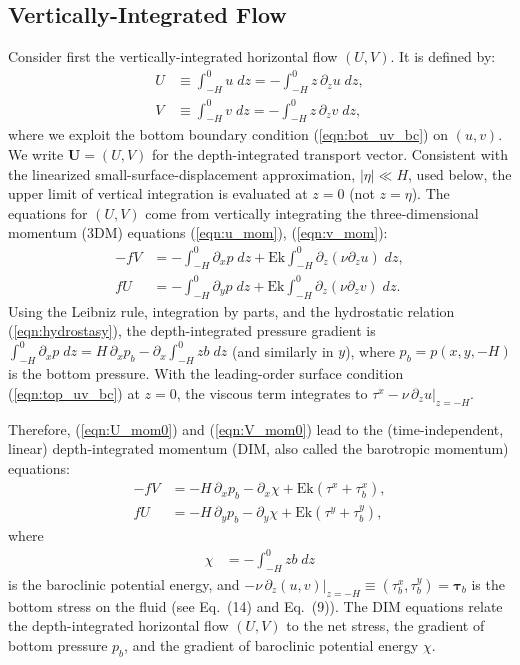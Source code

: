 \documentclass{ametsocV6.2}
\begin{document}
\subsection{Vertically-Integrated Flow}
Consider first the vertically-integrated horizontal flow $(U, V)$.
It is defined by:
\begin{align}
U & \equiv \int_{-H}^{0} u \; dz = - \int_{-H}^{0} z \, \partial_z u \; dz , \nonumber \\
V & \equiv \int_{-H}^{0} v \; dz = - \int_{-H}^{0} z \, \partial_z v \; dz ,
\label{eqn:UV_defs}
\end{align}
where we exploit the bottom boundary condition (\ref{eqn:bot_uv_bc}) on $(u, v)$. We write $\mathbf{U} = (U, V)$ for the depth-integrated transport vector.
Consistent with the linearized small-surface-displacement approximation, $|\eta| \ll H$, used below, the upper limit of vertical integration is evaluated at $z=0$ (not $z = \eta$). 
The equations for $(U, V)$ come from vertically integrating the three-dimensional momentum (3DM) equations (\ref{eqn:u_mom}), (\ref{eqn:v_mom}):
\begin{align}
- f V & = -  \int_{-H}^{0} \partial_x p \; dz + \mathrm{Ek}   \int_{-H}^{0} \partial_z \left( \nu \partial_z u \right) \; dz \label{eqn:U_mom0} , \\
f  U & = -  \int_{-H}^{0} \partial_y p \; dz + \mathrm{Ek}  \int_{-H}^{0} \partial_ z \left( \nu \partial_z v \right) \; dz . \label{eqn:V_mom0}
\end{align}
Using the Leibniz rule, integration by parts, and the hydrostatic relation (\ref{eqn:hydrostasy}), the depth-integrated pressure gradient is $\int_{-H}^{0} \partial_x p \; dz = H \, \partial_x p_b - \partial_x \int_{-H}^{0} z b \; dz$ (and similarly in $y$), where $p_b = p(x,y,-H)$ is the bottom pressure. With the leading-order surface condition (\ref{eqn:top_uv_bc}) at $z = 0$, the viscous term integrates to $\tau^x - \nu \, \partial_z u|_{z=-H}$.
  
Therefore, (\ref{eqn:U_mom0}) and (\ref{eqn:V_mom0}) lead to the (time-independent, linear) depth-integrated momentum (DIM, also called the barotropic momentum) equations:
 \begin{align}
- f V & = - H \, \partial_x p_b - \partial_x \chi + \mathrm{Ek} \left( \tau^x + \tau^x_b \right) , \label{eqn:U_mom} \\
  f U & = - H \, \partial_y p_b - \partial_y \chi + \mathrm{Ek} \left( \tau^y + \tau^y_b \right) \label{eqn:V_mom} ,
\end{align}
where
\begin{align}
\chi & = - \int_{-H}^{0} z b \; dz
\label{eqn:baroclinic_PE}
\end{align}
is the baroclinic potential energy, and $- \nu \, \left. \partial_z (u,v) \right|_{z = -H}  \equiv (\tau^x_b, \tau^y_b) = \boldsymbol{\tau}_b$ is the bottom stress on the fluid (see \citealt{hughes&killworth95} Eq.~(14) and \citealt{waldman&giordani23} Eq.~(9)).
The DIM equations relate the depth-integrated horizontal flow $(U,V)$ to the net stress, the gradient of bottom pressure $p_b$, and the gradient of baroclinic potential energy $\chi$.
\end{document}
